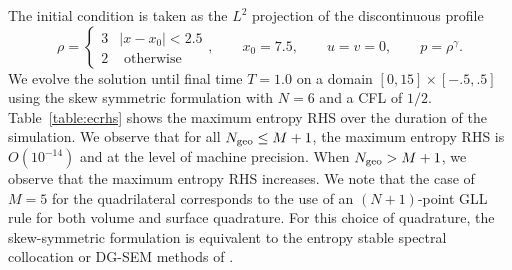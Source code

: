 \documentclass{svjour3}                     %
\begin{document}
The initial condition is taken as the $L^2$ projection of the discontinuous profile
\[
    \rho = \begin{cases}
    3 & |x-x_0| < 2.5\\
    2 & \text{ otherwise}
    \end{cases}, \qquad 
    x_0 = 7.5, \qquad u = v = 0, \qquad p = \rho^\gamma.
\]
We evolve the solution until final time $T = 1.0$ on a domain $[0,15]\times[-.5,.5]$ using the skew symmetric formulation with $N = 6$ and a CFL of $1/2$.  Table~\ref{table:ecrhs} shows the maximum entropy RHS over the duration of the simulation. We observe that for all $N_{\rm geo} \leq M+1$, the maximum entropy RHS is $O(10^{-14})$ and at the level of machine precision.  When $N_{\rm geo}> M+1$, we observe that the maximum entropy RHS increases.  We note that the case of $M= 5$ for the quadrilateral corresponds to the use of an $(N+1)$-point GLL rule for both volume and surface quadrature.  For this choice of quadrature, the skew-symmetric formulation is equivalent to the entropy stable spectral collocation or DG-SEM  methods of \cite{carpenter2014entropy, gassner2016split}.  

\begin{table}
\centering
{}\\
\caption{Maximum absolute value of the entropy RHS for degree $N=6$ over $t\in [0,1]$ on triangular and quadrilateral meshes.  The volume quadrature for the quadrilateral mesh is taken to be $(N+1)$-point GLL quadrature.  The surface quadrature is taken to be a 1D GLL quadrature with a varying number of points, such that the rule is exact for degree $M+N$ polynomials.  }
\label{table:ecrhs}
\end{table}
\end{document}
